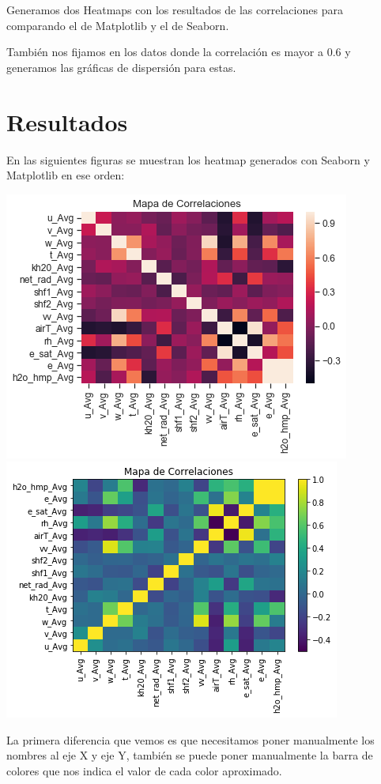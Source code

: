 \documentclass{article}
\begin{document}
Generamos dos Heatmaps con los resultados de las correlaciones para comparando el de Matplotlib y el de Seaborn.

También nos fijamos en los datos donde la correlación es mayor a 0.6
y generamos las gráficas de dispersión para estas.

\section{Resultados}
En las siguientes figuras se muestran los heatmap generados con Seaborn y Matplotlib en ese orden:

\begin{center}
    \includegraphics[scale = 0.5]{HmSns.png} \includegraphics[scale = 0.5]{HmMatplot1.png}
\end{center}

La primera diferencia que vemos es que necesitamos poner manualmente los nombres al eje X y eje Y, también se puede poner manualmente la barra de colores que nos indica el valor de cada color aproximado.
\end{document}
